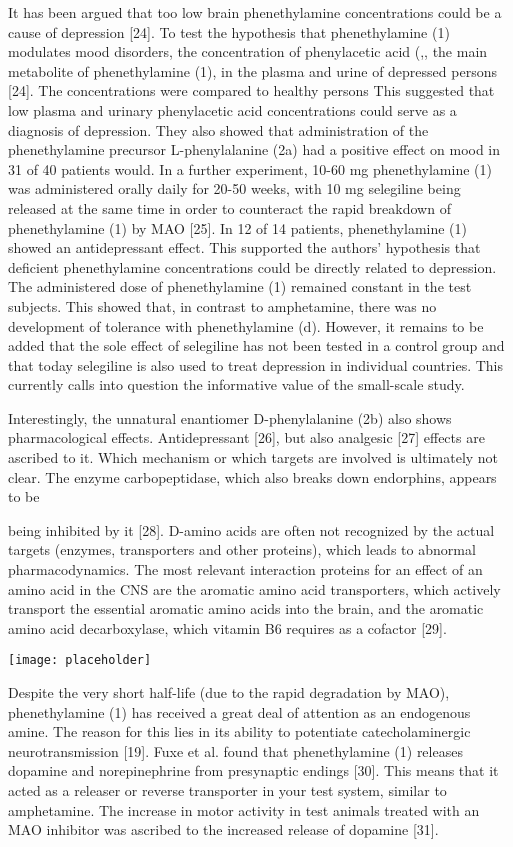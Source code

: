 It has been argued that too low brain phenethylamine concentrations could be a cause of depression [24]. To test the hypothesis that phenethylamine (1) modulates mood disorders, the concentration of phenylacetic acid (,, the main metabolite of phenethylamine (1), in the plasma and urine of depressed persons [24]. The concentrations were compared to healthy persons This suggested that low plasma and urinary phenylacetic acid concentrations could serve as a diagnosis of depression. They also showed that administration of the phenethylamine precursor L-phenylalanine (2a) had a positive effect on mood in 31 of 40 patients would.
In a further experiment, 10-60 mg phenethylamine (1) was administered orally daily for 20-50 weeks, with 10 mg selegiline being released at the same time in order to counteract the rapid breakdown of phenethylamine (1) by MAO [25]. In 12
of 14 patients, phenethylamine (1) showed an antidepressant effect. This supported the authors' hypothesis that deficient phenethylamine concentrations could be directly related to depression. The administered dose of phenethylamine (1) remained constant in the test subjects. This showed that, in contrast to amphetamine, there was no development of tolerance with phenethylamine (d). However, it remains to be added that the sole effect of selegiline has not been tested in a control group and that today selegiline is also used to treat depression in individual countries. This currently calls into question the informative value of the small-scale study.

Interestingly, the unnatural enantiomer D-phenylalanine (2b) also shows pharmacological effects. Antidepressant [26], but also analgesic [27] effects are ascribed to it. Which mechanism or which targets are involved is ultimately not clear. The enzyme carbopeptidase, which also breaks down endorphins, appears to be
\clearpage

being inhibited by it [28]. D-amino acids are often not recognized by the actual targets (enzymes, transporters and other proteins), which leads to abnormal pharmacodynamics. The most relevant interaction proteins for an effect of an amino acid in the CNS are the aromatic amino acid transporters, which actively transport the essential aromatic amino acids into the brain, and the aromatic amino acid decarboxylase, which vitamin B6 requires as a cofactor [29].

\texttt{[image: placeholder]}

Despite the very short half-life (due to the rapid degradation by MAO), phenethylamine (1) has received a great deal of attention as an endogenous amine. The reason for this lies in its ability to potentiate catecholaminergic neurotransmission [19]. Fuxe et al. found that phenethylamine (1) releases dopamine and norepinephrine from presynaptic endings [30]. This means that it acted as a releaser or reverse transporter in your test system, similar to amphetamine. The increase in motor activity in test animals treated with an MAO inhibitor was ascribed to the increased release of dopamine [31].

